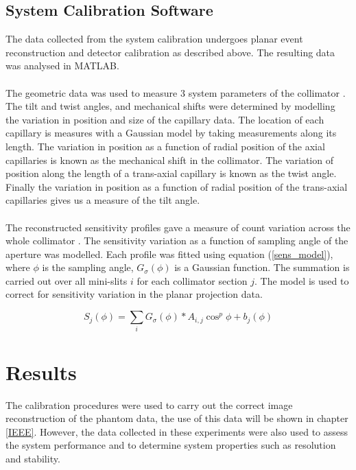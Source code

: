 \subsection{System Calibration Software}
The data collected from the system calibration undergoes planar event reconstruction and detector calibration as described above. The resulting data was analysed in MATLAB.
\paragraph{}
The geometric data was used to measure 3 system parameters of the collimator \cite{TianyuMa2007DeterminationMicroPET}. The tilt and twist angles, and mechanical shifts were determined by modelling the variation in position and size of the capillary data. The location of each capillary is measures with a Gaussian model by taking measurements along its length. The variation in position as a function of radial position of the axial capillaries is known as the mechanical shift in the collimator. The variation of position along the length of a trans-axial capillary is known as the twist angle. Finally the variation in position as a function of radial position of the trans-axial capillaries gives us a measure of the tilt angle. 
\paragraph{}
The reconstructed sensitivity profiles gave a measure of count variation across the whole collimator \cite{Accorsi2008DerivationCollimation}. The sensitivity variation as a function of sampling angle of the aperture was modelled. Each profile was fitted using equation (\ref{sens_model}), where $\phi$ is the sampling angle, $G_{\sigma}(\phi)$ is a Gaussian function. The summation is carried out over all mini-slits $i$ for each collimator section $j$. The model is used to correct for sensitivity variation in the planar projection data. 

\begin{equation}
\label{sens_model}
S_{j}(\phi) = \sum_{i} G_{\sigma}(\phi) \ast A_{i,j} \cos^{p}{\phi} + b_{j}(\phi)
\end{equation}

\section{Results}
The calibration procedures were used to carry out the correct image reconstruction of the phantom data, the use of this data will be shown in chapter \ref{IEEE}. However, the data collected in these experiments were also used to assess the system performance and to determine system properties such as resolution and stability. 

